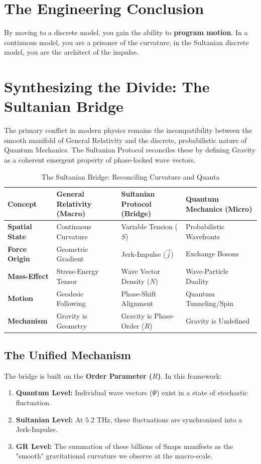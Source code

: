 \documentclass[11pt]{article}
\begin{document}
\section*{The Engineering Conclusion}
By moving to a discrete model, you gain the ability to \textbf{program motion}. In a continuous model, you are a prisoner of the curvature; in the Sultanian discrete model, you are the architect of the impulse.


\section{Synthesizing the Divide: The Sultanian Bridge}

The primary conflict in modern physics remains the incompatibility between the smooth manifold of General Relativity and the discrete, probabilistic nature of Quantum Mechanics. The Sultanian Protocol reconciles these by defining Gravity as a coherent emergent property of phase-locked wave vectors.

\begin{table}[h!]
\centering
\caption{The Sultanian Bridge: Reconciling Curvature and Quanta}
\label{tab:bridge_comparison}
\begin{tabular}{@{}p{2.5cm} p{3.5cm} p{3.5cm} p{3.5cm}@{}}
\toprule
\textbf{Concept} & \textbf{General Relativity (Macro)} & \textbf{Sultanian Protocol (Bridge)} & \textbf{Quantum Mechanics (Micro)} \\ \midrule
\textbf{Spatial State} & Continuous Curvature & Variable Tension ($S$) & Probabilistic Wavefronts \\
\textbf{Force Origin} & Geometric Gradient & Jerk-Impulse ($\vec{j}$) & Exchange Bosons \\
\textbf{Mass-Effect} & Stress-Energy Tensor & Wave Vector Density ($N$) & Wave-Particle Duality \\
\textbf{Motion} & Geodesic Following & Phase-Shift Alignment & Quantum Tunneling/Spin \\
\textbf{Mechanism} & Gravity is Geometry & Gravity is Phase-Order ($R$) & Gravity is Undefined \\
\bottomrule
\end{tabular}
\end{table}

\subsection*{The Unified Mechanism}
The bridge is built on the \textbf{Order Parameter ($R$)}. In this framework:
\begin{enumerate}
    \item \textbf{Quantum Level:} Individual wave vectors ($\Psi$) exist in a state of stochastic fluctuation.
    \item \textbf{Sultanian Level:} At $5.2$ THz, these fluctuations are synchronized into a Jerk-Impulse.
    \item \textbf{GR Level:} The summation of these billions of Snaps manifests as the "smooth" gravitational curvature we observe at the macro-scale.
\end{enumerate}
\end{document}
